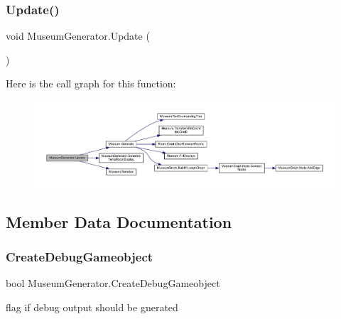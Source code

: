 \subsubsection{\texorpdfstring{Update()}{Update()}}
{\footnotesize\ttfamily void Museum\+Generator.\+Update (\begin{DoxyParamCaption}{ }\end{DoxyParamCaption})\hspace{0.3cm}{\ttfamily [private]}}

Here is the call graph for this function\+:
\nopagebreak
\begin{figure}[H]
\begin{center}
\leavevmode
\includegraphics[width=350pt]{class_museum_generator_afa0b7c3e8ab1bccedc4c7828cbf4724e_cgraph}
\end{center}
\end{figure}


\subsection{Member Data Documentation}
\mbox{\label{class_museum_generator_a09fab0187bd69fd0c13220168b4a7ad2}} 
\subsubsection{\texorpdfstring{Create\+Debug\+Gameobject}{CreateDebugGameobject}}
{\footnotesize\ttfamily bool Museum\+Generator.\+Create\+Debug\+Gameobject}



flag if debug output should be gnerated 

\mbox{\label{class_museum_generator_ae7a748c64ae256fdc85e29a79a2fc0a8}} 
